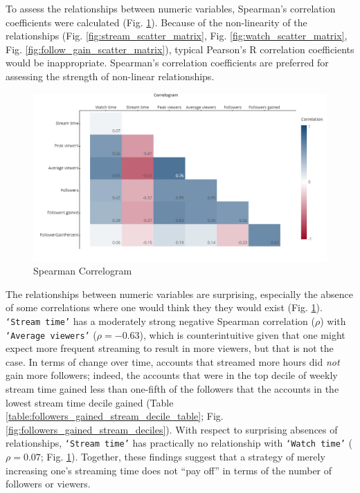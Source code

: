\documentclass[12pt]{article}
\begin{document}
To assess the relationships between numeric variables, Spearman’s correlation coefficients were calculated (Fig. \ref{fig:spearman_correlogram}). Because of the non-linearity of the relationships (Fig. \ref{fig:stream_scatter_matrix}, Fig. \ref{fig:watch_scatter_matrix}, Fig. \ref{fig:follow_gain_scatter_matrix}), typical Pearson’s R correlation coefficients would be inappropriate. Spearman’s correlation coefficients are preferred for assessing the strength of non-linear relationships.
\begin{figure}[H]
  \centering %
  \includegraphics[width=\linewidth]{../StatCrunch_Results/spearman_correlogram}
  \captionsetup{justification=centering, singlelinecheck=false, margin=2cm}
  \caption[Spearman Correlogram]{Spearman Correlogram}
  \label{fig:spearman_correlogram}
\end{figure}

The relationships between numeric variables are surprising, especially the absence of some correlations where one would think they they would exist (Fig. \ref{fig:spearman_correlogram}). \texttt{`Stream time’} has a moderately strong negative Spearman correlation ($\rho$) with \texttt{`Average viewers’} ($\rho = -0.63$), which is counterintuitive given that one might expect more frequent streaming to result in more viewers, but that is not the case. In terms of change over time, accounts that streamed more hours did \emph{not} gain more followers; indeed, the accounts that were in the top decile of weekly stream time gained less than one-fifth of the followers that the accounts in the lowest stream time decile gained (Table \ref{table:followers_gained_stream_decile_table}; Fig. \ref{fig:followers_gained_stream_deciles}).  With respect to surprising absences of relationships, \texttt{`Stream time’} has practically no relationship with \texttt{`Watch time’} ($\rho = 0.07$; Fig. \ref{fig:spearman_correlogram}). Together, these findings suggest that a strategy of merely increasing one’s streaming time does not “pay off” in terms of the number of followers or viewers.
\end{document}
